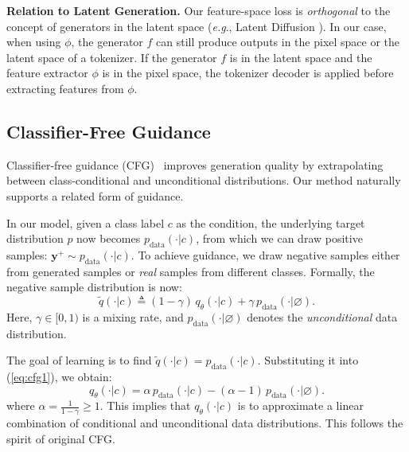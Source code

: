 \documentclass{article}
\newcommand{\vv}[1]{\mathbf{#1}}
\newcommand{\y}{\vv{y}}
\renewcommand{\paragraph}[1]{\vspace{.05em}\noindent\textbf{#1}}
\def\onedot{.}
\def\eg{\emph{e.g}\onedot} \def\Eg{\emph{E.g}\onedot}
\theoremstyle{plain}
\theoremstyle{definition}
\theoremstyle{remark}
\begin{document}
\paragraph{Relation to Latent Generation.}
Our feature-space loss is \textit{orthogonal} to the concept of generators in the latent space (\eg, Latent Diffusion \cite{rombach2022high}).
In our case, when using $\phi$,
the generator $f$ can still produce outputs in the pixel space or the latent space of a tokenizer.
If the generator $f$ is in the latent space and the feature extractor $\phi$ is in the pixel space, the tokenizer decoder is applied before extracting features from $\phi$.


\subsection{Classifier-Free Guidance}
\label{subsec:additive_guidance}

Classifier-free guidance (CFG)~\cite{ho2022classifier} improves generation quality by extrapolating between class-conditional and unconditional distributions.
Our method naturally supports a related form of guidance.


In our model, given a class label $c$ as the condition, the underlying target distribution $p$ now becomes $p_{\text{data}}(\cdot|c)$, from which we can draw positive samples: $\y^+ \sim p_{\text{data}}(\cdot|c)$.
To achieve guidance, we draw {negative} samples either from generated samples or \textit{real} samples from different classes.
Formally, the negative sample distribution is now:
\begin{equation}
\tilde{q}(\cdot|c) \triangleq (1-\gamma)\,q_\theta(\cdot|c)   + \gamma\,p_{\text{data}}(\cdot | \varnothing).
\label{eq:cfg1}
\end{equation}
Here, $\gamma \in [0, 1)$ is a mixing rate,
and $p_{\text{data}}(\cdot | \varnothing)$ denotes the \textit{unconditional} data distribution\footnotemark{}.

The goal of learning is to find $\tilde{q}(\cdot|c)=p_\text{data}(\cdot|c)$.
Substituting it into (\ref{eq:cfg1}), we obtain:
\begin{equation}
q_\theta(\cdot|c) = \alpha\, p_{\text{data}}(\cdot|c) - (\alpha - 1)\, p_{\text{data}}(\cdot | \varnothing).
\label{eq:cfg2}
\end{equation}
where $\alpha=\frac{1}{1-\gamma} \geq 1$.
This implies that $q_\theta(\cdot|c)$ is to approximate a linear combination of conditional and unconditional data distributions. This follows the spirit of original CFG.
\end{document}
